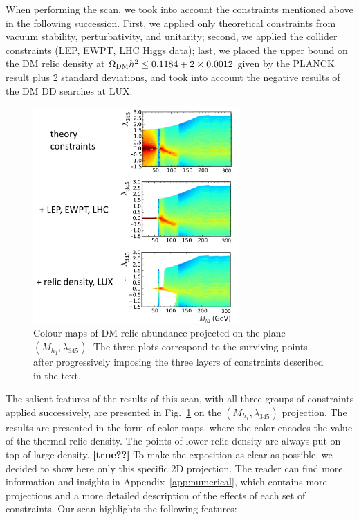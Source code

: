 \documentclass[12pt,a4paper]{article}
\newcommand {\red} {\color{red}}
\begin{document}
When performing the scan, we took into account the constraints mentioned above
in the following succession. First, we applied only theoretical constraints from vacuum stability, 
perturbativity, and unitarity;
second, we applied the collider constraints (LEP, EWPT, LHC Higgs data);
last, we placed the upper bound on the DM relic density at $\Omega_{\rm DM} h^2 \le 0.1184+2\times 0.0012$ 
given by the PLANCK result plus 2 standard deviations, 
and took into account the negative results of the DM DD searches at LUX.

\begin{figure}[tbh]
\begin{center}
\includegraphics[width=0.7\textwidth]{simplified.jpg}
\caption{Colour maps of DM relic abundance projected on the plane $(M_{h_1},\lambda_{345})$. The three plots correspond to the surviving points after progressively imposing the three layers of constraints described in the text. \label{fig:scan-simplified}} 
\end{center}
\end{figure}

The salient features of the results of this scan,
with all three groups of constraints applied successively, 
are presented in Fig.~\ref{fig:scan-simplified} on the $(M_{h_1},\lambda_{345})$ projection.
The results are presented in the form of color maps, where the color encodes the value of the thermal relic density.
{\red The points of lower relic density are always put on top of large density. {\bf [true??]}} 
To make the exposition as clear as possible, we decided to show here only this specific 2D projection. 
The reader can find more information and insights in Appendix~\ref{app:numerical}, which contains more projections and a more detailed description of the effects of each set of constraints.
Our scan highlights the following features:
\end{document}
